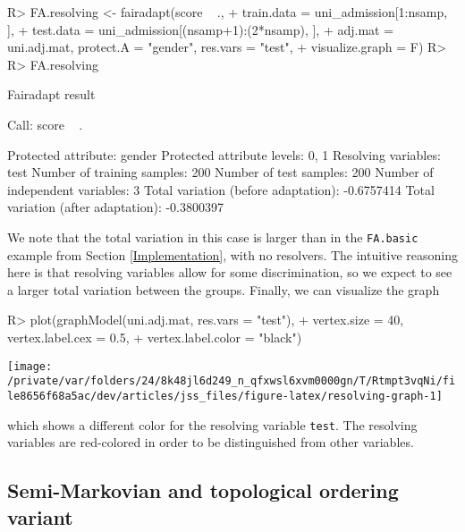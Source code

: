 \documentclass[
  notitle]{jss}
\begin{document}
\begin{CodeChunk}
\begin{CodeInput}
R> FA.resolving <- fairadapt(score ~ .,
+   train.data = uni_admission[1:nsamp, ],
+   test.data = uni_admission[(nsamp+1):(2*nsamp), ],
+   adj.mat = uni.adj.mat, protect.A = "gender", res.vars = "test",
+   visualize.graph = F)
R> 
R> FA.resolving
\end{CodeInput}
\begin{CodeOutput}
Fairadapt result

Call:
 score ~ . 

Protected attribute:                  gender 
Protected attribute levels:           0, 1 
Resolving variables:                  test 
Number of training samples:           200 
Number of test samples:               200 
Number of independent variables:      3 
Total variation (before adaptation):  -0.6757414 
Total variation (after adaptation):   -0.3800397 
\end{CodeOutput}
\end{CodeChunk}

We note that the total variation in this case is larger than in the
\texttt{FA.basic} example from Section \ref{Implementation}, with no
resolvers. The intuitive reasoning here is that resolving variables
allow for some discrimination, so we expect to see a larger total
variation between the groups. Finally, we can visualize the graph

\begin{CodeChunk}
\begin{CodeInput}
R> plot(graphModel(uni.adj.mat, res.vars = "test"),
+   vertex.size = 40, vertex.label.cex = 0.5,
+   vertex.label.color = "black")
\end{CodeInput}


\begin{center}\texttt{[image: /private/var/folders/24/8k48jl6d249\_n\_qfxwsl6xvm0000gn/T/Rtmpt3vqNi/file8656f68a5ac/dev/articles/jss\_files/figure-latex/resolving-graph-1]} \end{center}

\end{CodeChunk}

which shows a different color for the resolving variable \texttt{test}.
The resolving variables are red-colored in order to be distinguished
from other variables.

\hypertarget{semi-markovian-and-topological-ordering-variant}{%
\subsection{Semi-Markovian and topological ordering
variant}\label{semi-markovian-and-topological-ordering-variant}}
\end{document}
